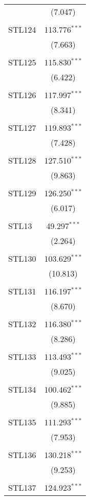 \begin{table}[!htbp]
\begin{tabular}{@{\extracolsep{5pt}}lc}
  & (7.047) \\ 
  & \\ 
 STL124 & 113.776$^{***}$ \\ 
  & (7.663) \\ 
  & \\ 
 STL125 & 115.830$^{***}$ \\ 
  & (6.422) \\ 
  & \\ 
 STL126 & 117.997$^{***}$ \\ 
  & (8.341) \\ 
  & \\ 
 STL127 & 119.893$^{***}$ \\ 
  & (7.428) \\ 
  & \\ 
 STL128 & 127.510$^{***}$ \\ 
  & (9.863) \\ 
  & \\ 
 STL129 & 126.250$^{***}$ \\ 
  & (6.017) \\ 
  & \\ 
 STL13 & 49.297$^{***}$ \\ 
  & (2.264) \\ 
  & \\ 
 STL130 & 103.629$^{***}$ \\ 
  & (10.813) \\ 
  & \\ 
 STL131 & 116.197$^{***}$ \\ 
  & (8.670) \\ 
  & \\ 
 STL132 & 116.380$^{***}$ \\ 
  & (8.286) \\ 
  & \\ 
 STL133 & 113.493$^{***}$ \\ 
  & (9.025) \\ 
  & \\ 
 STL134 & 100.462$^{***}$ \\ 
  & (9.885) \\ 
  & \\ 
 STL135 & 111.293$^{***}$ \\ 
  & (7.953) \\ 
  & \\ 
 STL136 & 130.218$^{***}$ \\ 
  & (9.253) \\ 
  & \\ 
 STL137 & 124.923$^{***}$ \\ 

\end{tabular}
\end{table}
